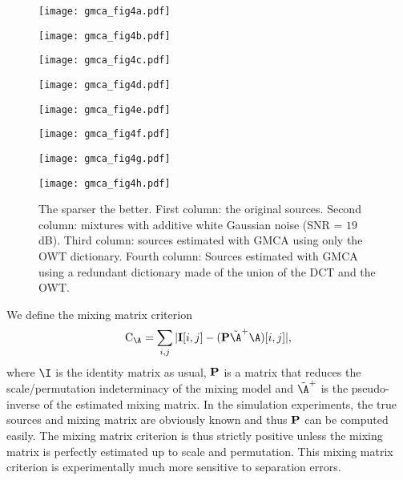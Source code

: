 \begin{figure}[htb]
\begin{minipage}[b]{0.2\linewidth}
\centerline{         \texttt{[image: gmca\_fig4a.pdf]}}
\end{minipage}
\hfill
\begin{minipage}[b]{0.2\linewidth}
     \centerline{         \texttt{[image: gmca\_fig4b.pdf]}}

\end{minipage}
\hfill
\begin{minipage}[b]{0.2\linewidth}
      \centerline{         \texttt{[image: gmca\_fig4c.pdf]}}
\end{minipage}
\hfill
\begin{minipage}[b]{0.2\linewidth}
      \centerline{         \texttt{[image: gmca\_fig4d.pdf]}}
 \end{minipage}
\vfill
\begin{minipage}[b]{0.2\linewidth}
       \centerline{         \texttt{[image: gmca\_fig4e.pdf]}}
 \end{minipage}
\hfill
\begin{minipage}[b]{0.2\linewidth}
        \centerline{         \texttt{[image: gmca\_fig4f.pdf]}}
 \end{minipage}
\hfill
\begin{minipage}[b]{0.2\linewidth}
        \centerline{         \texttt{[image: gmca\_fig4g.pdf]}}
 \end{minipage}
\hfill
\begin{minipage}[b]{0.2\linewidth}
        \centerline{         \texttt{[image: gmca\_fig4h.pdf]}}
 \end{minipage}
\caption{The sparser the better. First column: the original sources. Second column: mixtures with additive white Gaussian noise (SNR = $19$ dB). Third column: sources estimated with GMCA using only the OWT dictionary. Fourth column: Sources estimated with GMCA using a redundant dictionary made of the union of the DCT and the OWT.} 
\label{fig:bgmca_tstb_signals}
\end{figure} 
We define the mixing matrix criterion 
\[
\mathrm{C}_{\A} = \sum_{i,j}|{\bf I}[i,j] - ({\bf P}{\tilde{\A}}^{+} {\A})[i,j]|,
\] 
where $\I$ is the identity matrix as usual, ${\bf P}$ is a matrix that reduces the scale/permutation indeterminacy of the mixing model and ${\tilde{\A}}^+$ is the pseudo-inverse of the estimated mixing matrix. In the simulation experiments, the true sources and mixing matrix are obviously known and thus ${\bf P}$ can be computed easily. The mixing matrix criterion is thus strictly positive unless the mixing matrix is perfectly estimated up to scale and permutation. This mixing matrix criterion is experimentally much more sensitive to separation errors.


